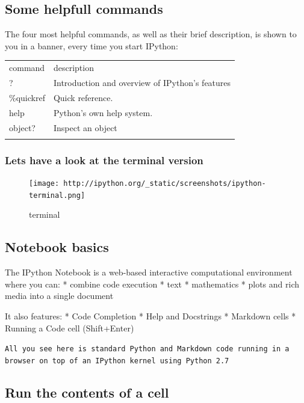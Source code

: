 \documentclass{article}
\begin{document}
    \subsection{Some helpfull commands}

The four most helpful commands, as well as their brief description, is
shown to you in a banner, every time you start IPython:

\begin{longtable}[c]{@{}ll@{}}
\hline\noalign{\medskip}
command & description
\\\noalign{\medskip}
\hline\noalign{\medskip}
? & Introduction and overview of IPython's features
\\\noalign{\medskip}
\%quickref & Quick reference.
\\\noalign{\medskip}
help & Python's own help system.
\\\noalign{\medskip}
object? & Inspect an object
\\\noalign{\medskip}
\hline
\end{longtable}

\subsubsection{Lets have a look at the terminal version}

\begin{figure}[htbp]
\centering
\texttt{[image: http://ipython.org/\_static/screenshots/ipython-terminal.png]}
\caption{terminal}
\end{figure}

    \subsection{Notebook basics}

The IPython Notebook is a web-based interactive computational
environment where you can: * combine code execution * text * mathematics
* plots and rich media into a single document

It also features: * Code Completion * Help and Docstrings * Markdown
cells * Running a Code cell (Shift+Enter)

\texttt{All you see here is standard Python and Markdown code running in a browser on top of an IPython kernel using Python 2.7}

    \subsection{Run the contents of a cell}
\end{document}
